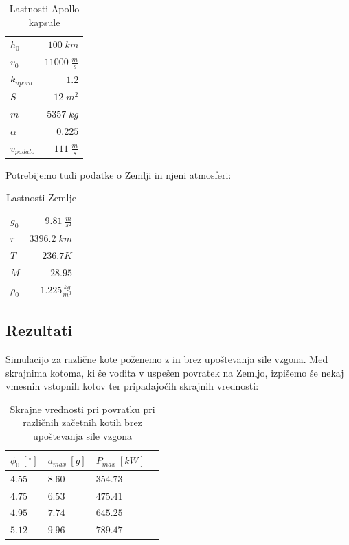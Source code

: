 \documentclass[11pt,a4paper]{article}
\begin{document}
\begin{table}[H]
	\centering
	\caption{Lastnosti Apollo kapsule \cite{lift-and-drag-of-apollo-command-module} \cite{command-module-overview} \cite{entry-aerodynamics} }
	\vspace{0.3cm}
	\def\arraystretch{1.5}
	\begin{tabular}{l|r}
		$h_0$ & $100 \; km$ \\
		$v_0$ & $11000 \; \frac{m}{s}$ \\
		$k_{upora}$ & $1.2$ \\
		$S$ & $12 \; m^2$ \\
		$m$ & $5357 \; kg $\\
		$\alpha$ & $0.225$ \\
		$v_{padalo}$ & $111 \; \frac{m}{s}$
	\end{tabular}
	\def\arraystretch{1}
\end{table}
\vspace{0.4cm}
Potrebijemo tudi podatke o Zemlji in njeni atmosferi:
\begin{table}[H]
	\centering
	\caption{Lastnosti Zemlje \cite{earths-atmosphere}}
	\vspace{0.3cm}
	\def\arraystretch{1.5}
	\begin{tabular}{l|r}
		$g_0$ & $9.81 \; \frac{m}{s^2}$ \\
		$r$ & $3396.2 \; km$ \\
		$T$ & $236.7 K$ \\
		$M$ & $28.95$ \\
		$\rho_0$ & $1.225 \frac{kg}{m^3} $
	\end{tabular}
	\def\arraystretch{1}
\end{table}

\clearpage

\subsection{Rezultati}
Simulacijo za razli\v cne kote po\v zenemo z in brez upo\v stevanja sile vzgona. Med skrajnima kotoma, ki \v se vodita v uspe\v sen povratek na Zemljo, izpi\v semo \v se nekaj vmesnih vstopnih kotov ter pripadajo\v cih skrajnih vrednosti:


\begin{table}[H]
	\centering
	\caption{Skrajne vrednosti pri povratku pri razli\v cnih za\v cetnih kotih brez upo\v stevanja sile vzgona}
	\vspace{0.3cm}
	\def\arraystretch{1.5}
	\begin{tabular}{l|lll}
	$ \phi_0\ [^\circ] $ & $a_{max}\ [g]$ & $ P_{max} \ [kW] $ \\
	\hline
	$ 4.55 $ & $ 8.60 $ & $ 354.73 $ \\
	$ 4.75 $ & $ 6.53 $ & $ 475.41 $ \\
	$ 4.95 $ & $ 7.74 $ & $ 645.25 $ \\
	$ 5.12 $ & $ 9.96 $ & $ 789.47 $
	\end{tabular}
	\def\arraystretch{1}
\end{table}
\end{document}
